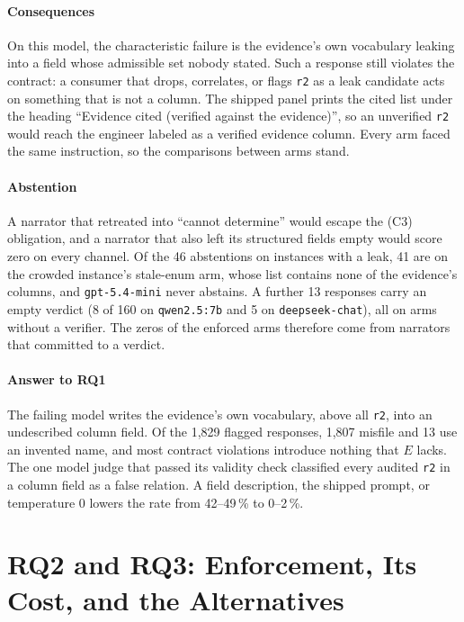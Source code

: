 \documentclass[smallextended,natbib]{svjour3}
\begin{document}
\paragraph{Consequences}
On this model, the characteristic failure is the evidence's own vocabulary
leaking into a field whose admissible set nobody stated. Such a response still
violates the contract: a consumer that drops, correlates, or flags \texttt{r2}
as a leak candidate acts on something that is not a column. The shipped panel
prints the cited list under the heading ``Evidence cited (verified against the
evidence)'', so an unverified \texttt{r2} would reach the engineer labeled as
a verified evidence column. Every arm faced the same instruction, so the
comparisons between arms stand.

\paragraph{Abstention}
A narrator that retreated into ``cannot determine'' would escape the (C3)
obligation, and a narrator that also left its structured fields empty would
score zero on every channel. Of the 46 abstentions on instances with a leak,
41 are on the crowded instance's stale-enum arm, whose list contains none of
the evidence's columns, and \texttt{gpt-5.4-mini} never abstains. A further 13
responses carry an empty verdict (8 of 160 on \texttt{qwen2.5:7b} and 5 on
\texttt{deepseek-chat}), all on arms without a verifier. The zeros of the
enforced arms therefore come from narrators that committed to a verdict.

\paragraph{Answer to RQ1}
The failing model writes the evidence's own vocabulary, above all
\texttt{r2}, into an undescribed column field. Of the 1{,}829 flagged
responses, 1{,}807 misfile and 13 use an invented name, and most contract
violations introduce nothing that $E$ lacks. The one model judge that passed its
validity check classified every audited \texttt{r2} in a column field as a
false relation. A field description, the
shipped prompt, or temperature 0 lowers the rate from 42--49\,\% to
0--2\,\%.

\section{RQ2 and RQ3: Enforcement, Its Cost, and the Alternatives}\label{sec:rq3}
\end{document}
